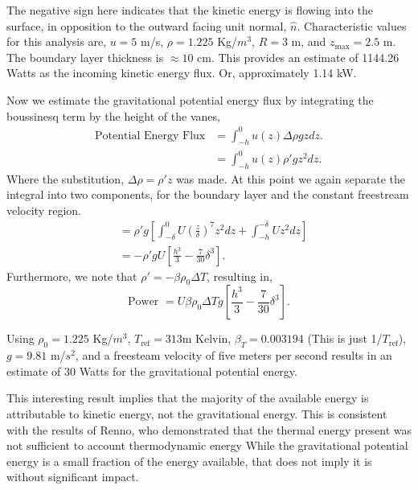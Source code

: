 The negative sign here indicates that the kinetic energy is flowing into
the surface, in opposition to the outward facing unit normal, $\hat
n$. Characteristic values for this analysis are, $u = 5$ m/s, $\rho =
1.225$ Kg/$m^3$, $R = 3$ m, and $z_{\text{max}} = 2.5$ m. The boundary
layer thickness is $\approx 10$ cm. This provides
an estimate of 1144.26 Watts as the incoming kinetic energy flux. Or,
approximately 1.14 kW.  

Now we estimate the gravitational potential energy flux by integrating 
the boussinesq term by the height of the vanes, 
\begin{align*}
  \text{Potential Energy Flux} & = \int_{-h}^0 u(z) \Delta \rho g z dz. \\
  & = \int_{-h}^0 u(z) \rho' g z^2 dz. 
\end{align*}
Where the substitution, $\Delta \rho = \rho' z$ was made. At 
this point we again separate the integral into two components, 
for the boundary layer and the constant freestream velocity region. 
\begin{align*}
  & = \rho' g \left[ \int_{-\delta}^{0} U \left( \frac{z}{\delta} \right)^7 z^2 dz 
      + \int_{-h}^{-\delta} U z^2 dz \right] \\
  & = -\rho' g U \left[ \frac{h^3}{3} - \frac{7}{30} \delta^3 \right].
\end{align*}
Furthermore, we
note that $\rho' = -\beta \rho_0 \Delta T$, resulting in, 
%
%
\begin{equation}
 \text{Power } = U \beta \rho_0 \Delta T g \left[ \frac{h^3}{3} -
					    \frac{7}{30} \delta^3
					   \right]. 
\end{equation}

Using $\rho_0 = 1.225$ Kg/$m^3$, $T_{\text{ref}}=313$m Kelvin, $\beta_T = 0.003194$
(This is just 1/$T_{\text{ref}}$), $g=9.81$ m/$s^2$, and a freesteam
velocity of five meters per second results in an
estimate of 30 Watts for the gravitational potential energy. 

This interesting result implies that the majority of the available
energy is attributable to kinetic energy, not the gravitational
energy. This is consistent with the results of Renno, who demonstrated
that the thermal energy present was not sufficient to account 
thermodynamic energy 
%
%
While the gravitational potential energy is a small fraction of the
energy available, that does not imply it is without significant impact. 

